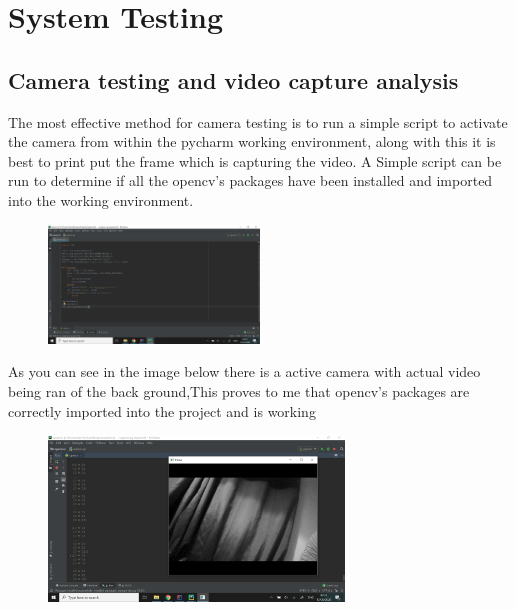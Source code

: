 \section{System Testing}

\subsection{Camera testing and video capture analysis }
The most effective method for camera testing  is to run a simple script  to activate the camera from within the pycharm working environment, along with this it is best to print put the frame which is capturing the video. A Simple script can be run to determine  if  all the opencv's packages have been installed  and imported into the working environment. 



\begin{figure}[h]
\includegraphics[width=0.5\textwidth]{Figures/videoScript.png}
\end{figure}



As you can see in the image below there is a active camera with actual video being ran of the back ground,This proves to me that opencv's packages are correctly imported into the project and is working 

\begin{figure}[h]
\includegraphics[width=0.7\textwidth]{Figures/video capture.png}
\end{figure}


